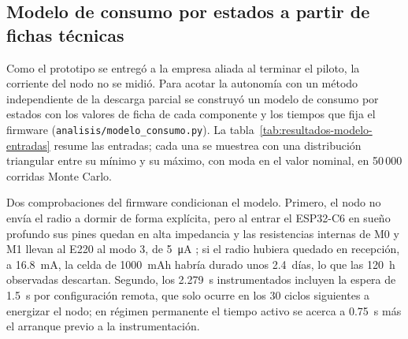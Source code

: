 \subsection{Modelo de consumo por estados a partir de fichas técnicas}
\label{sec:resultados-modelo-consumo}
Como el prototipo se entregó a la empresa aliada al terminar el piloto, la corriente del nodo no se midió. Para acotar la autonomía con un método independiente de la descarga parcial se construyó un modelo de consumo por estados con los valores de ficha de cada componente y los tiempos que fija el firmware (\texttt{analisis/modelo\_consumo.py}). La tabla~\ref{tab:resultados-modelo-entradas} resume las entradas; cada una se muestrea con una distribución triangular entre su mínimo y su máximo, con moda en el valor nominal, en 50\,000 corridas Monte Carlo.

Dos comprobaciones del firmware condicionan el modelo. Primero, el nodo no envía el radio a dormir de forma explícita, pero al entrar el ESP32-C6 en sueño profundo sus pines quedan en alta impedancia y las resistencias internas de M0 y M1 llevan al E220 al modo 3, de \SI{5}{\micro\ampere} \citep{e220manual}; si el radio hubiera quedado en recepción, a 16.8~mA, la celda de 1000~mAh habría durado unos 2.4~días, lo que las 120~h observadas descartan. Segundo, los 2.279~s instrumentados incluyen la espera de 1.5~s por configuración remota, que solo ocurre en los 30 ciclos siguientes a energizar el nodo; en régimen permanente el tiempo activo se acerca a 0.75~s más el arranque previo a la instrumentación.

